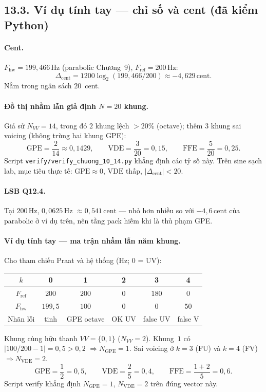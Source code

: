 \subsection*{13.3. Ví dụ tính tay --- chỉ số và cent (đã kiểm Python)}

\paragraph{Cent.} $F_{\mathrm{hw}}=199{,}466\,\text{Hz}$ (parabolic Chương~9), $F_{\mathrm{ref}}=200\,\text{Hz}$:
\[
\Delta_{\mathrm{cent}}=1200\log_2(199{,}466/200)\approx -4{,}629\,\text{cent}.
\]
Nằm trong ngân sách $20$~cent.

\paragraph{Đồ thị nhầm lẫn giả định $N=20$ khung.} Giả sử $N_{VV}=14$, trong đó $2$ khung lệch $>20\%$ (octave); thêm $3$ khung sai voicing (không trùng hai khung GPE):
\[
\mathrm{GPE}=\frac{2}{14}\approx 0{,}1429,\qquad
\mathrm{VDE}=\frac{3}{20}=0{,}15,\qquad
\mathrm{FFE}=\frac{5}{20}=0{,}25.
\]
Script \texttt{verify/verify\_chuong\_10\_14.py} khẳng định các tỷ số này. Trên sine sạch lab, mục tiêu thực tế: $\mathrm{GPE}\approx 0$, $\mathrm{VDE}$ thấp, $|\Delta_{\mathrm{cent}}|<20$.

\paragraph{LSB Q12.4.} Tại $200\,\text{Hz}$, $0{,}0625\,\text{Hz}$ $\approx 0{,}541\,\text{cent}$ --- nhỏ hơn nhiều so với $-4{,}6\,\text{cent}$ của parabolic ở ví dụ trên, nên tầng pack hiếm khi là thủ phạm GPE.


\paragraph{Ví dụ tính tay --- ma trận nhầm lẫn năm khung.}
Cho tham chiếu Praat và hệ thống (Hz; $0$ = UV):
\begin{center}\small
\begin{tabular}{@{}cccccc@{}}\toprule
$k$ & 0 & 1 & 2 & 3 & 4 \\
\midrule
$F_{\mathrm{ref}}$ & $200$ & $200$ & $0$ & $180$ & $0$ \\
$F_{\mathrm{hw}}$ & $199{,}5$ & $100$ & $0$ & $0$ & $50$ \\
Nhãn lỗi & tinh & GPE octave & OK UV & false UV & false V \\
\bottomrule
\end{tabular}
\end{center}
Khung cùng hữu thanh $VV=\{0,1\}$ ($N_{VV}=2$). Khung~$1$ có $|100/200-1|=0{,}5>0{,}2$ $\Rightarrow N_{\mathrm{GPE}}=1$. Sai voicing ở $k=3$ (FU) và $k=4$ (FV) $\Rightarrow N_{\mathrm{VDE}}=2$.
\[
\mathrm{GPE}=\frac{1}{2}=0{,}5,\qquad
\mathrm{VDE}=\frac{2}{5}=0{,}4,\qquad
\mathrm{FFE}=\frac{1+2}{5}=0{,}6.
\]
Script verify khẳng định $N_{\mathrm{GPE}}=1$, $N_{\mathrm{VDE}}=2$ trên đúng vector này.

